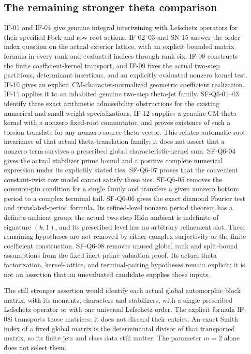 \subsection{The remaining stronger theta comparison}
IF-01 and IF-04 give genuine integral intertwining with Lefschetz
operators for their specified Fock and row-root actions. IF-02--03 and SN-15
answer the order-index question on the actual exterior lattice, with
an explicit bounded matrix formula in every rank and evaluated indices
through rank six.
IF-08 constructs the finite coefficient-kernel transport, and
IF-09 fixes the actual two-step partitions, determinant insertions,
and an explicitly evaluated nonzero kernel test. IF-10 gives an
explicit CM-character-normalized geometric coefficient realization.
IF-11 applies it to an inhabited genuine two-step theta-jet family.
SF-Q6-01--03 identify three exact arithmetic admissibility obstructions
for the existing numerical and small-weight specializations.
IF-12 supplies a genuine CM theta kernel with a nonzero fixed-root
commutator, and proves existence of such a torsion translate for any
nonzero source theta vector. This refutes automatic root invariance
of that actual theta-translation family; it does not assert that a
nonzero term survives a prescribed global characteristic-kernel sum.
SF-Q6-04 gives the actual stabilizer prime bound and a positive
complete numerical expression under its explicitly stated ties.
SF-Q6-07 proves that the convenient constant-twist row model cannot
satisfy those ties. SF-Q6-05 removes the common-pin condition for
a single family and transfers a given nonzero bottom period to a
complex terminal tail. SF-Q6-06 gives the exact diamond Fourier
test and translated-period formula. Its refined-level nonzero
period theorem has a definite ambient group; the actual two-step
Hida ambient is indefinite of signature $(k,1)$, and its prescribed
level has no arbitrary refinement slot. These remaining hypotheses
are not removed by either complex surjectivity or the finite
coefficient construction.
SF-Q6-08 removes unused global rank and split-bound assumptions
from the fixed inert-prime valuation proof. Its actual theta
factorization, kernel-lattice, and terminal-pairing hypotheses
remain explicit; it is not an assertion that an unevaluated
candidate supplies those inputs.

The still stronger assertion would identify each actual global
automorphic block matrix, with its moments, characters and
stabilizers, with a single prescribed Lefschetz operator or with
one universal Lefschetz order. The explicit formula IF-08i
transports those matrices; it does not discard their entries.
An exact Smith index of a fixed global matrix is the determinantal
divisor of that transported matrix, so its finite jets and class
data still matter. The parameter $m=2$ alone does not select them.

